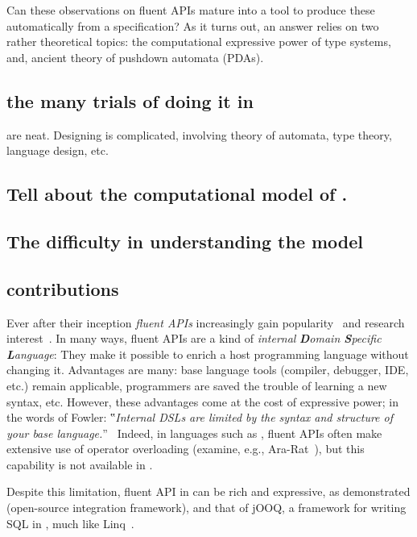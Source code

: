 Can these observations on fluent APIs mature into
  a tool to produce these automatically from a specification?
As it turns out, an answer relies on
  two rather theoretical topics:
  the computational expressive power of type systems,
  and, ancient theory of pushdown automata (PDAs).

  \subsection{the many trials of doing it in \Java}
are neat. Designing is complicated,
involving theory of automata, type theory, language design, etc.

\subsection{Tell about the computational model of \CC.}

\subsection{The difficulty in understanding the \Java model}

\subsection{contributions}

Ever after their inception \emph{fluent APIs}
  increasingly gain popularity~\cite{Bauer:2005,Freeman:Pryce:06,Larsen:2012} and research
  interest~\cite{Deursen:2000,Kabanov:2008}.
In many ways, fluent APIs are a kind of
  \emph{internal} \emph{\textbf Domain \textbf Specific \textbf Language}:
They make it possible to enrich a host programming language without changing it.
Advantages are many: base language tools (compiler, debugger, IDE, etc.) remain
  applicable, programmers are saved the trouble of learning a new syntax, etc.
However, these advantages come at the cost of expressive power;
  in the words of Fowler:
  ‟\emph{Internal DSLs are limited by the syntax and structure of your base language.}”~\cite{Fowler:2005}
Indeed, in languages such as \CC, fluent APIs
  often make extensive use of operator overloading (examine, e.g., \textsf{Ara-Rat}~\cite{Gil:Lenz:07}),
  but this capability is not available in \Java.

Despite this limitation, fluent API in \Java can be rich and expressive, as demonstrated
(open-source integration framework),
and that of jOOQ, a framework for writing
  SQL in \Java, much like Linq~\cite{Meijer:Beckman:Bierman:06}.

